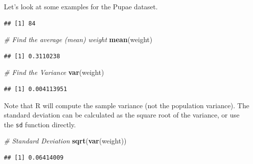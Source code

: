 \documentclass[]{book}
\newenvironment{Shaded}{\begin{snugshade}}{\end{snugshade}}
\newcommand{\CommentTok}[1]{\textcolor[rgb]{0.56,0.35,0.01}{\textit{#1}}}
\newcommand{\KeywordTok}[1]{\textcolor[rgb]{0.13,0.29,0.53}{\textbf{#1}}}
\newcommand{\NormalTok}[1]{#1}
\newcommand{\OperatorTok}[1]{\textcolor[rgb]{0.81,0.36,0.00}{\textbf{#1}}}
\newcommand{\StringTok}[1]{\textcolor[rgb]{0.31,0.60,0.02}{#1}}
\begin{document}
Let's look at some examples for the Pupae dataset.

\begin{Shaded}
\end{Shaded}

\begin{verbatim}
## [1] 84
\end{verbatim}

\begin{Shaded}
\begin{Highlighting}[]
\CommentTok{# Find the average (mean) weight}
\KeywordTok{mean}\NormalTok{(weight)}
\end{Highlighting}
\end{Shaded}

\begin{verbatim}
## [1] 0.3110238
\end{verbatim}

\begin{Shaded}
\begin{Highlighting}[]
\CommentTok{# Find the Variance}
\KeywordTok{var}\NormalTok{(weight)}
\end{Highlighting}
\end{Shaded}

\begin{verbatim}
## [1] 0.004113951
\end{verbatim}

Note that R will compute the sample variance (not the population variance). The standard deviation can be calculated as the square root of the variance, or use the \texttt{sd} function directly.

\begin{Shaded}
\begin{Highlighting}[]
\CommentTok{# Standard Deviation}
\KeywordTok{sqrt}\NormalTok{(}\KeywordTok{var}\NormalTok{(weight))}
\end{Highlighting}
\end{Shaded}

\begin{verbatim}
## [1] 0.06414009
\end{verbatim}
\end{document}
